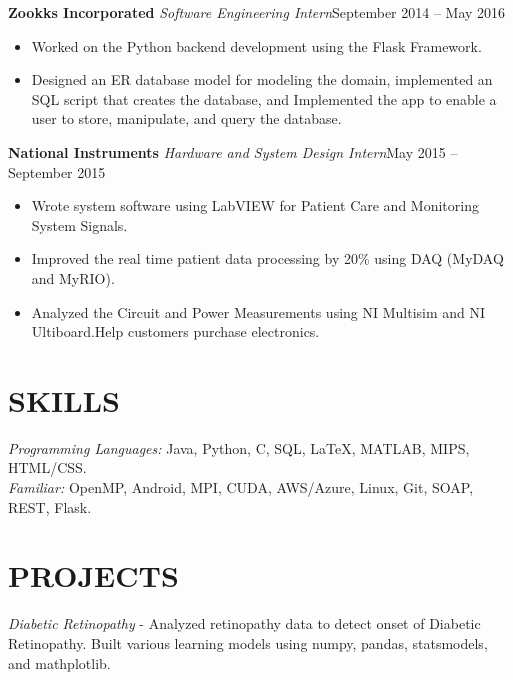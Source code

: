 \documentclass[11pt]{res}
\begin{document}
\begin{resume}
{\bfseries \large Zookks Incorporated} \newline 
 {\sl Software Engineering Intern}\hfill  September 2014 – May 2016\\
  \vspace{-2mm}
 \begin{itemize}
 \item Worked on the Python backend development using the Flask Framework.
 \item Designed an ER database model for modeling the domain, implemented an SQL script that creates the
database, and Implemented the app to enable a user to store, manipulate, and query the database.
 \end{itemize}
  \vspace{-2mm}
 
{\bfseries \large National Instruments} \newline 
 {\sl Hardware and System Design Intern}\hfill May 2015 – September 2015\\
 \vspace{-2mm}
 \begin{itemize}
 \item Wrote system software using LabVIEW for Patient Care and Monitoring System Signals.
 \item Improved the real time patient data processing by 20\% using DAQ (MyDAQ and MyRIO).
 \item Analyzed the Circuit and Power Measurements using NI Multisim and NI Ultiboard.Help customers purchase electronics.
 \end{itemize}
  \vspace{-2mm}
 
\section{\Large {}\selectfont SKILLS}
{\sl Programming Languages:}   Java, Python, C, SQL, \LaTeX, MATLAB, MIPS, HTML/CSS. \\
{\sl Familiar:} OpenMP, Android, MPI, CUDA, AWS/Azure, Linux, Git, SOAP, REST, Flask.
 \vspace{-2mm}

\section{\large {}\selectfont PROJECTS}
{\itshape \large Diabetic Retinopathy} - Analyzed retinopathy data to detect onset of Diabetic Retinopathy. Built various learning models using numpy, pandas, statsmodels, and mathplotlib.


\end{resume}
\end{document}
